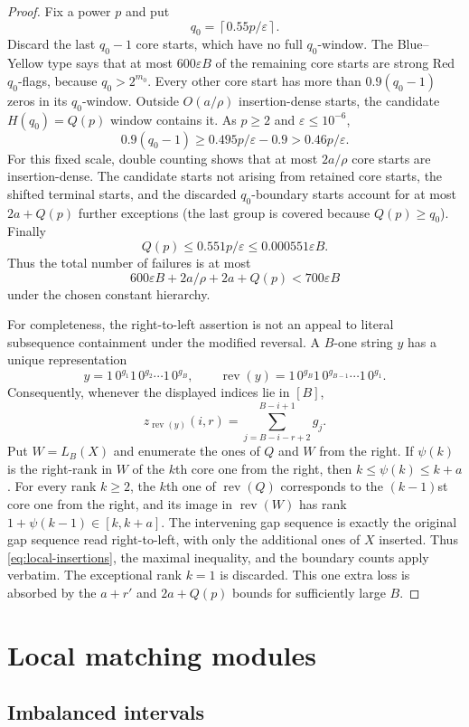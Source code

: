 \documentclass[11pt]{article}
\theoremstyle{remark}
\newcommand{\rev}{\operatorname{rev}}
\newcommand{\eps}{\varepsilon}
\begin{document}
\begin{proof}
Fix a power $p$ and put
\[
 q_0=\left\lceil0.55p/\eps\right\rceil.
\]
Discard the last $q_0-1$ core starts, which have no full $q_0$-window.  The
Blue--Yellow type says that at most $600\eps B$ of the remaining core starts
are strong
Red $q_0$-flags, because $q_0>2^{m_0}$.  Every other core start has more than
$0.9(q_0-1)$ zeros in its $q_0$-window.  Outside $O(a/\rho)$ insertion-dense
starts, the candidate $H(q_0)=Q(p)$ window contains it.  As $p\ge2$ and
$\eps\le10^{-6}$,
\[
 0.9(q_0-1)
 \ge0.495p/\eps-0.9
 >0.46p/\eps.
\]
For this fixed scale, double counting shows that at most $2a/\rho$ core
starts are insertion-dense.  The candidate starts not arising from retained
core starts, the shifted terminal starts, and the discarded $q_0$-boundary
starts account for at most $2a+Q(p)$ further exceptions (the last group is
covered because $Q(p)\ge q_0$).  Finally
\[
 Q(p)\le0.551p/\eps\le0.000551\eps B.
\]
Thus the total number of failures is at most
\[
 600\eps B+2a/\rho+2a+Q(p)<700\eps B
\]
under the chosen constant hierarchy.

For completeness, the right-to-left assertion is not an appeal to literal
subsequence containment under the modified reversal.  A $B$-one string $y$
has a unique representation
\[
 y=1\,0^{g_1}1\,0^{g_2}\cdots1\,0^{g_B},
 \qquad
 \rev(y)=1\,0^{g_B}1\,0^{g_{B-1}}\cdots1\,0^{g_1}.
\]
Consequently, whenever the displayed indices lie in $[B]$,
\[
 z_{\rev(y)}(i,r)=
 \sum_{j=B-i-r+2}^{B-i+1}g_j.
\]
Put $W=L_B(X)$ and enumerate the ones of $Q$ and $W$ from the right.  If
$\psi(k)$ is the right-rank in $W$ of the $k$th core one from the right,
then $k\le\psi(k)\le k+a$.  For every rank $k\ge2$, the $k$th one of
$\rev(Q)$ corresponds to the $(k-1)$st core one from the right, and its image
in $\rev(W)$ has rank $1+\psi(k-1)\in[k,k+a]$.  The intervening gap sequence
is exactly the original gap sequence read right-to-left, with only the
additional ones of $X$ inserted.  Thus \eqref{eq:local-insertions}, the
maximal inequality, and the boundary counts apply verbatim.  The exceptional
rank $k=1$ is discarded.  This one extra loss is absorbed by the
$a+r'$ and $2a+Q(p)$ bounds for sufficiently large $B$.
\end{proof}

\section{Local matching modules}
\label{sec:local-modules}

\subsection{Imbalanced intervals}
\end{document}
